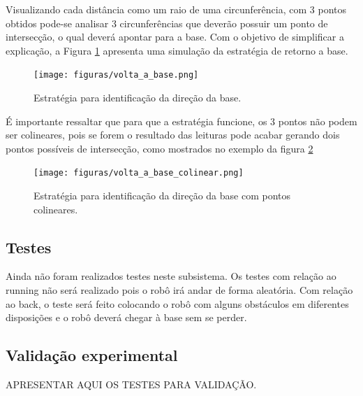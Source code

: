 	 	Visualizando cada distância como um raio de uma circunferência, com 3 pontos obtidos pode-se analisar 3 circunferências que deverão possuir um ponto de intersecção, o qual deverá apontar para a base. Com o objetivo de simplificar a explicação, a Figura \ref{img:back} apresenta uma simulação da estratégia de retorno a base.

	 	\begin{figure}[H]
			\centering
			\texttt{[image: figuras/volta\_a\_base.png]}
			\caption{Estratégia para identificação da direção da base.}
			\label{img:back}
		\end{figure} 

		É importante ressaltar que para que a estratégia funcione, os 3 pontos não podem ser colineares, pois se forem o resultado das leituras pode acabar gerando dois pontos possíveis de intersecção, como mostrados no exemplo da figura \ref{img:back2}

		\begin{figure}[H]
			\centering
			\texttt{[image: figuras/volta\_a\_base\_colinear.png]}
			\caption{Estratégia para identificação da direção da base com pontos colineares.}
			\label{img:back2}
		\end{figure} 

	 \subsection{Testes}
	
		Ainda não foram realizados testes neste subsistema. Os testes com relação ao running não será realizado pois o robô irá andar de forma aleatória. Com relação ao back, o teste será feito colocando o robô com alguns obstáculos em diferentes disposições e o robô deverá chegar à base sem se perder.

\subsection{Validação experimental} %
	\label{sub:validação_experimental}

	APRESENTAR AQUI OS TESTES PARA VALIDAÇÃO.
